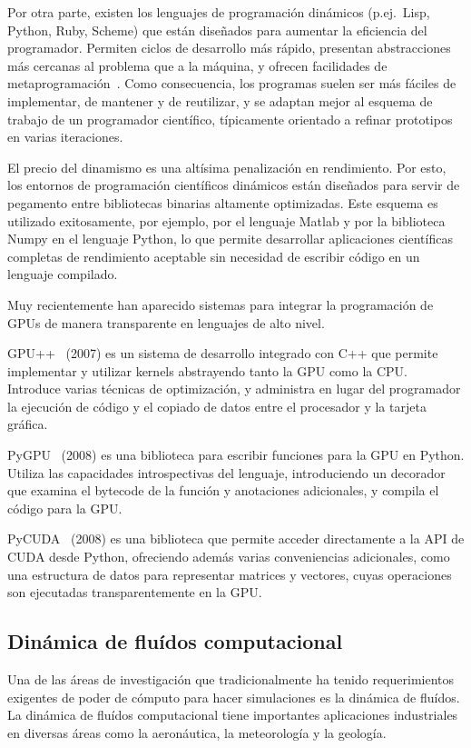 \documentclass[11pt,spanish]{article}
\begin{document}
Por otra parte, existen los lenguajes de programación dinámicos (p.ej.~Lisp,
Python, Ruby, Scheme) que están diseñados para aumentar la eficiencia
del programador.  Permiten ciclos de desarrollo más rápido, presentan
abstracciones más cercanas al problema que a la máquina, y ofrecen
facilidades de metaprogramación~\cite[\S2]{pygpu}.  Como consecuencia, los
programas suelen ser más fáciles de implementar, de mantener y de reutilizar,
y se adaptan mejor al esquema de trabajo de un programador científico,
típicamente orientado a refinar prototipos en varias iteraciones.

El precio del dinamismo es una altísima penalización en rendimiento.  Por esto,
los entornos de programación científicos dinámicos están diseñados para servir
de pegamento entre bibliotecas binarias altamente optimizadas.  Este esquema es
utilizado exitosamente, por ejemplo, por el lenguaje Matlab y por la biblioteca
Numpy en el lenguaje Python, lo que permite desarrollar aplicaciones científicas
completas de rendimiento aceptable sin necesidad de escribir código en un
lenguaje compilado.

Muy recientemente han aparecido sistemas para integrar la programación de GPUs
de manera transparente en lenguajes de alto nivel.

GPU++~\cite{gpupp} (2007) es un sistema de desarrollo integrado con C++ que
permite implementar y utilizar kernels abstrayendo tanto la GPU como la CPU.
Introduce varias técnicas de optimización, y administra en lugar del programador
la ejecución de código y el copiado de datos entre el procesador y la tarjeta
gráfica.

PyGPU~\cite{pygpu} (2008) es una biblioteca para escribir funciones para la
GPU en Python. Utiliza las capacidades introspectivas del lenguaje,
introduciendo un decorador que examina el bytecode de la función y anotaciones
adicionales, y compila el código para la GPU.

PyCUDA~\cite{pycuda} (2008) es una biblioteca que permite acceder directamente a
la API de CUDA desde Python, ofreciendo además varias conveniencias adicionales,
como una estructura de datos para representar matrices y vectores, cuyas
operaciones son ejecutadas transparentemente en la GPU.


\subsection{Dinámica de fluídos computacional}
Una de las áreas de investigación que tradicionalmente ha tenido requerimientos
exigentes de poder de cómputo para hacer simulaciones es la dinámica de fluídos.
La dinámica de fluídos computacional tiene importantes aplicaciones industriales
en diversas áreas como la aeronáutica, la meteorología y la geología.
\end{document}
